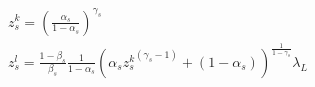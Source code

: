 \begin{gather}\label{eq:reallocation_firm_input_ratio}
    z_{s}^k = (\frac{\alpha_s}{1-\alpha_s})^{\gamma_s} \\
    z_{s}^l = \frac{1-\beta_s}{\beta_s} \frac{1}{1-\alpha_s} (\alpha_s {z^k_{s}}^{(\gamma_s -1)} + (1-\alpha_s))^{\frac{1}{1-\gamma_s}} \lambda_L
  \end{gather}